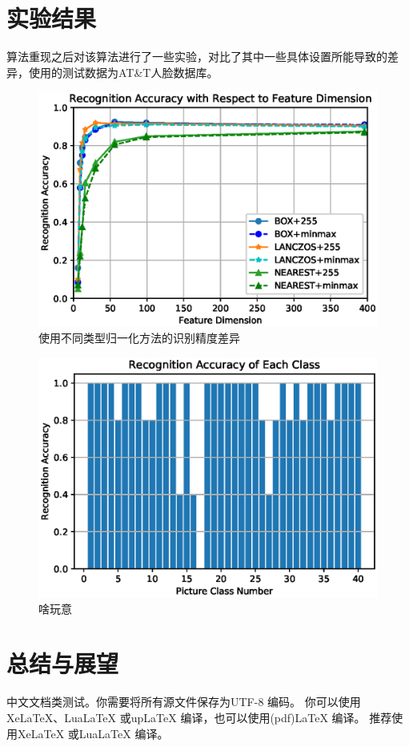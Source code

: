 \documentclass[UTF8]{ctexart}
\begin{document}
\section{实验结果}\label{sec-3}
算法重现之后对该算法进行了一些实验，对比了其中一些具体设置所能导致的差异，使用的测试数据为AT&T人脸数据库。
\begin{figure}[h]
    \centering
    \includegraphics[scale = 0.6]{RA_Method.eps}
    \caption{使用不同类型归一化方法的识别精度差异}\label{fig-1}
\end{figure}
\begin{figure}[h]
    \centering
    \includegraphics[scale = 0.6]{RA_Class.eps}
    \caption{啥玩意}\label{fig-2}
\end{figure}

\section{总结与展望}\label{sec-4}

中文文档类测试。你需要将所有源文件保存为UTF-8 编码。
你可以使用XeLaTeX、LuaLaTeX 或upLaTeX 编译，也可以使用(pdf)LaTeX 编译。
推荐使用XeLaTeX 或LuaLaTeX 编译。
\appendix

\printindex %
\end{document}
